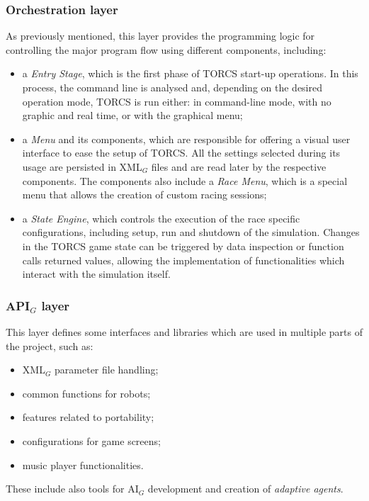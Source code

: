 \subsubsection{Orchestration layer}
As previously mentioned, this layer provides the programming logic for controlling the major program flow using different components, including:
\begin{itemize}
	\item a \textit{Entry Stage}, which is the first phase of TORCS start-up operations. In this process, the command line is analysed and, depending on the desired operation mode, TORCS is run either: in command-line mode, with no graphic and real time, or with the graphical menu;
	\item a \textit{Menu} and its components, which are responsible for offering a visual user interface to ease the setup of TORCS. All the settings selected during its usage are persisted in XML$_G$ files and are read later by the respective components. The components also include a \textit{Race Menu}, which is a special menu that allows the creation of custom racing sessions;
	\item a \textit{State Engine}, which controls the execution of the race specific configurations, including setup, run and shutdown of the simulation. Changes in the TORCS game state can be triggered by data inspection or function calls returned values, allowing the implementation of functionalities which interact with the simulation itself.
\end{itemize}

\subsubsection{API$_G$ layer}
This layer defines some interfaces and libraries which are used in multiple parts of the project, such as:
\begin{itemize}
	\item XML$_G$ parameter file handling;
	\item common functions for robots;
	\item features related to portability;
	\item configurations for game screens;
	\item music player functionalities.
\end{itemize}
These include also tools for AI$_G$ development and creation of \textit{adaptive agents}.

